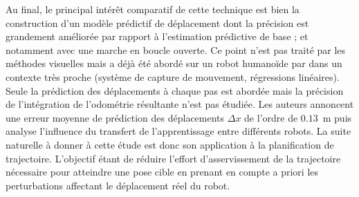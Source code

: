Au final, le principal intérêt comparatif de cette technique est bien la construction d'un
modèle prédictif de déplacement dont la précision est grandement améliorée par rapport
à l'estimation prédictive de base ; et notamment avec une marche en boucle ouverte. 
Ce point n'est pas traité par les méthodes visuelles mais a déjà été abordé 
sur un robot humanoïde par \cite{schmitz_learning_2010} dans un contexte 
très proche (système de capture de mouvement, régressions linéaires). 
Seule la prédiction des déplacements à chaque pas est abordée mais la précision de 
l'intégration de l'odométrie résultante n'est pas étudiée.
Les auteurs annoncent une erreur moyenne de prédiction des déplacements $\Delta x$
de l'ordre de $0.13$~m puis analyse l'influence du transfert de l'apprentissage 
entre différents robots.
La suite naturelle à donner à cette étude est donc son application
à la planification de trajectoire.
L'objectif étant de réduire l'effort d'asservissement de la trajectoire
nécessaire pour atteindre une pose cible en prenant en compte a priori 
les perturbations affectant le déplacement réel du robot.

